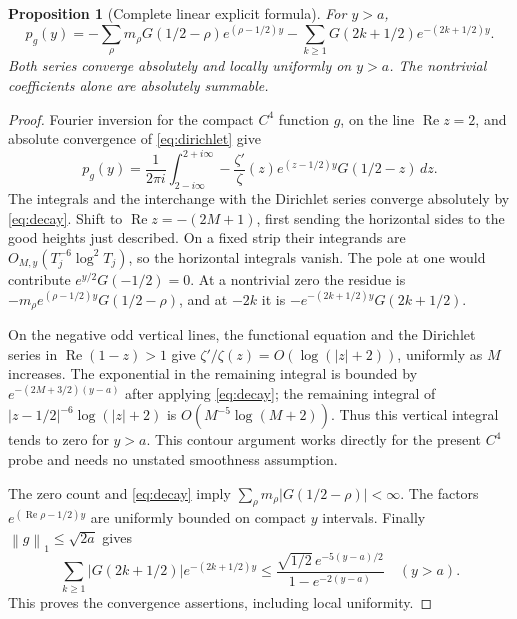 \documentclass[11pt]{article}
\newtheorem{proposition}[theorem]{Proposition}
\theoremstyle{remark}
\newcommand{\dd}{\,d}
\newcommand{\Rea}{\operatorname{Re}}
\newcommand{\norm}[1]{\left\|#1\right\|}
\numberwithin{equation}{section}
\begin{document}
\begin{proposition}[Complete linear explicit formula]\label{prop:explicit}
For $y>a$,
\begin{equation}\label{eq:explicit}
p_g(y)=-\sum_\rho m_\rho G(1/2-\rho)e^{(\rho-1/2)y}
-\sum_{k\ge1}G(2k+1/2)e^{-(2k+1/2)y}.
\end{equation}
Both series converge absolutely and locally uniformly on $y>a$.
The nontrivial coefficients alone are absolutely summable.
\end{proposition}
\begin{proof}
Fourier inversion for the compact $C^4$ function $g$, on the line
$\Rea z=2$, and absolute convergence of \eqref{eq:dirichlet} give
\[
p_g(y)=\frac1{2\pi i}\int_{2-i\infty}^{2+i\infty}
-\frac{\zeta'}{\zeta}(z)
e^{(z-1/2)y}G(1/2-z)\dd z.
\]
The integrals and the interchange with the Dirichlet series converge
absolutely by \eqref{eq:decay}. Shift to
$\Rea z=-(2M+1)$, first sending the horizontal sides to the good heights
just described. On a fixed strip their integrands are
$O_{M,y}(T_j^{-6}\log^2T_j)$, so the horizontal integrals vanish.
The pole at one would contribute $e^{y/2}G(-1/2)=0$.
At a nontrivial zero the residue is
$-m_\rho e^{(\rho-1/2)y}G(1/2-\rho)$, and at $-2k$ it is
$-e^{-(2k+1/2)y}G(2k+1/2)$.

On the negative odd vertical lines, the functional equation and the
Dirichlet series in $\Rea(1-z)>1$ give
$\zeta'/\zeta(z)=O(\log(|z|+2))$, uniformly as $M$ increases.
The exponential in the remaining integral is bounded by
$e^{-(2M+3/2)(y-a)}$ after applying \eqref{eq:decay}; the remaining
integral of $|z-1/2|^{-6}\log(|z|+2)$ is
$O(M^{-5}\log(M+2))$. Thus this vertical integral tends to zero for
$y>a$. This contour argument works directly for the present $C^4$
probe and needs no unstated smoothness assumption.

The zero count and \eqref{eq:decay} imply
$\sum_\rho m_\rho|G(1/2-\rho)|<\infty$.
The factors $e^{(\Rea\rho-1/2)y}$ are uniformly bounded on compact
$y$ intervals. Finally $\norm g_1\le\sqrt{2a}$ gives
\begin{equation}\label{eq:trivial}
\sum_{k\ge1}|G(2k+1/2)|e^{-(2k+1/2)y}
\le \frac{\sqrt{1/2}\,e^{-5(y-a)/2}}{1-e^{-2(y-a)}}\quad(y>a).
\end{equation}
This proves the convergence assertions, including local uniformity.
\end{proof}
\end{document}
